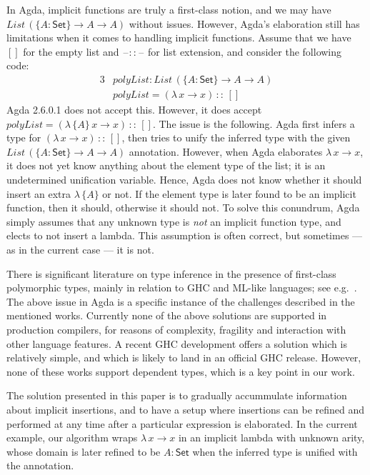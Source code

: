 \documentclass[acmsmall,screen,dvipsnames]{acmart}\settopmatter{}
\newcommand{\blank}{\mathord{\hspace{1pt}\text{--}\hspace{1pt}}}
\newcommand{\kw}[1]{{\mathsf{#1}}}
\newcommand{\mi}[1]{\mathit{#1}}
\theoremstyle{remark}
\begin{document}
In Agda, implicit functions are truly a first-class notion, and we may have
$List\,(\{A : \kw{Set}\}\to A \to A)$ without issues. However, Agda's elaboration
still has limitations when it comes to handling implicit functions. Assume that
we have $[]$ for the empty list and $\blank::\blank$ for list extension,
and consider the following code:
\begin{alignat*}{3}
  & \mi{polyList} : List\,(\{A : \kw{Set}\}\to A \to A)\\
  & \mi{polyList} = (\lambda\,x \to x)\,::\,[]
\end{alignat*}
Agda 2.6.0.1 does not accept this. However, it does accept $\mi{polyList} =
(\lambda\,\{A\}\,x \to x)\,::\,[]$. The issue is the following. Agda first
infers a type for $(\lambda\,x \to x)\,::\,[]$, then tries to unify the
inferred type with the given $List\,(\{A : \kw{Set}\}\to A \to A)$
annotation. However, when Agda elaborates $\lambda\,x \to x$, it does not yet
know anything about the element type of the list; it is an undetermined
unification variable. Hence, Agda does not know whether it should insert an
extra $\lambda\,\{A\}$ or not. If the element type is later found to be an
implicit function, then it should, otherwise it should not. To solve this
conundrum, Agda simply assumes that any unknown type is \emph{not} an implicit
function type, and elects to not insert a lambda. This assumption is often
correct, but sometimes --- as in the current case --- it is not.

There is significant literature on type inference in the presence of first-class
polymorphic types, mainly in relation to GHC and ML-like languages; see
e.g.\ \cite{leijen2008hmf,leijen2009flexible,serrano2018guarded,vytiniotis2006boxy}.
The above issue in Agda is a specific instance of the challenges described in
the mentioned works. Currently none of the above solutions are supported in
production compilers, for reasons of complexity, fragility and interaction with
other language features. A recent GHC development \cite{serrano2020a} offers a
solution which is relatively simple, and which is likely to land in an official
GHC release. However, none of these works support dependent types, which is a
key point in our work.

The solution presented in this paper is to gradually accummulate information
about implicit insertions, and to have a setup where insertions can be refined
and performed at any time after a particular expression is elaborated. In the
current example, our algorithm wraps $\lambda\,x\to x$ in an implicit lambda
with unknown arity, whose domain is later refined to be $A : \kw{Set}$ when the
inferred type is unified with the annotation.
\end{document}
